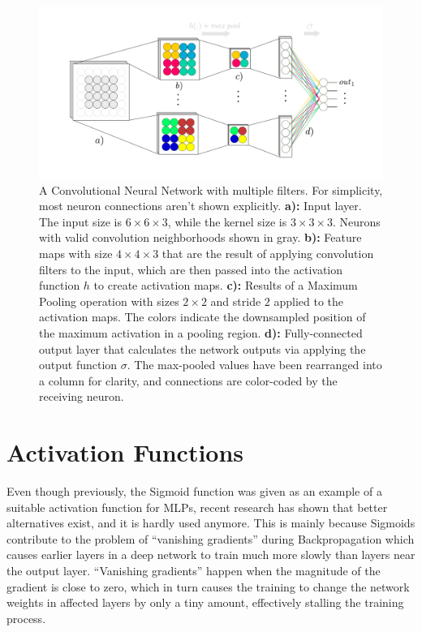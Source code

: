 \begin {figure}[!ht]
	\begin{center}
		\includegraphics[scale=0.75]{img/fig_convnet}
	\end{center}
	\caption{A Convolutional Neural Network with multiple filters. For simplicity, most neuron connections aren't shown explicitly. \textbf{a):} Input layer. The input size is $6 \times 6 \times 3$, while the kernel size is $3 \times 3 \times 3$. Neurons with valid convolution neighborhoods shown in gray. \textbf{b):} Feature maps with size $4 \times 4 \times 3$ that are the result of applying convolution filters to the input, which are then passed into the activation function $h$ to create activation maps. \textbf{c):} Results of a Maximum Pooling operation with sizes $2 \times 2$ and stride $2$ applied to the activation maps. The colors indicate the downsampled position of the maximum activation in a pooling region. \textbf{d):} Fully-connected output layer that calculates the network outputs via applying the output function $\sigma$. The max-pooled values have been rearranged into a column for clarity, and connections are color-coded by the receiving neuron.}
	\label{fig:convnet}
\end {figure}


	\section {Activation Functions}
Even though previously, the Sigmoid function was given as an example of a suitable activation function for MLPs, recent research has shown that better alternatives exist, and it is hardly used anymore. This is mainly because Sigmoids contribute to the problem of ``vanishing gradients'' during Backpropagation which causes earlier layers in a deep network to train much more slowly than layers near the output layer. ``Vanishing gradients'' happen when the magnitude of the gradient is close to zero, which in turn causes the training to change the network weights in affected layers by only a tiny amount, effectively stalling the training process.

